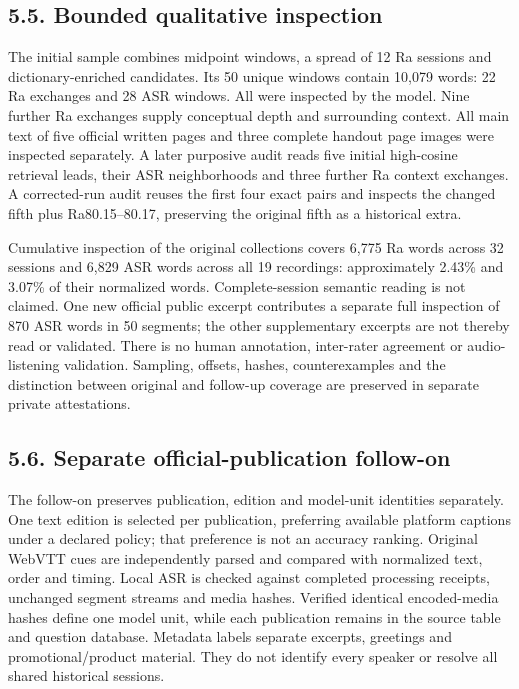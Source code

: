 \documentclass[
  11pt,
]{article}
\begin{document}
\FloatBarrier

\subsection{5.5. Bounded qualitative
inspection}\label{bounded-qualitative-inspection}

The initial sample combines midpoint windows, a spread of 12 Ra sessions
and dictionary-enriched candidates. Its 50 unique windows contain 10,079
words: 22 Ra exchanges and 28 ASR windows. All were inspected by the
model. Nine further Ra exchanges supply conceptual depth and surrounding
context. All main text of five official written pages and three complete
handout page images were inspected separately. A later purposive audit
reads five initial high-cosine retrieval leads, their ASR neighborhoods
and three further Ra context exchanges. A corrected-run audit reuses the
first four exact pairs and inspects the changed fifth plus
Ra80.15--80.17, preserving the original fifth as a historical extra.

Cumulative inspection of the original collections covers 6,775 Ra words
across 32 sessions and 6,829 ASR words across all 19 recordings:
approximately 2.43\% and 3.07\% of their normalized words.
Complete-session semantic reading is not claimed. One new official
public excerpt contributes a separate full inspection of 870 ASR words
in 50 segments; the other supplementary excerpts are not thereby read or
validated. There is no human annotation, inter-rater agreement or
audio-listening validation. Sampling, offsets, hashes, counterexamples
and the distinction between original and follow-up coverage are
preserved in separate private attestations.

\FloatBarrier

\subsection{5.6. Separate official-publication
follow-on}\label{separate-official-publication-follow-on}

The follow-on preserves publication, edition and model-unit identities
separately. One text edition is selected per publication, preferring
available platform captions under a declared policy; that preference is
not an accuracy ranking. Original WebVTT cues are independently parsed
and compared with normalized text, order and timing. Local ASR is
checked against completed processing receipts, unchanged segment streams
and media hashes. Verified identical encoded-media hashes define one
model unit, while each publication remains in the source table and
question database. Metadata labels separate excerpts, greetings and
promotional/product material. They do not identify every speaker or
resolve all shared historical sessions.
\end{document}
